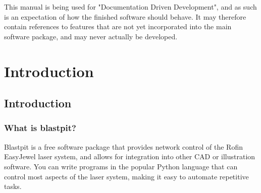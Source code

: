 \documentclass[12pt,fleqn]{book} %
\begin{document}

\newpage

This manual is being used for "Documentation Driven Development", and as such
is an expectation of how the finished software should behave. It may therefore
contain references to features that are not yet incorporated into the main
software package, and may never actually be developed.

\newpage



\pagestyle{empty} %

\tableofcontents %

\cleardoublepage %

\pagestyle{fancy} %


\part{Introduction}



\chapter{Introduction}

\section{What is blastpit?}

Blastpit is a free software package that provides network control of the Rofin
EasyJewel laser system, and allows for integration into other CAD or
illustration software. You can write programs in the popular Python language
that can control most aspects of the laser system, making it easy to automate
repetitive tasks.
\end{document}
